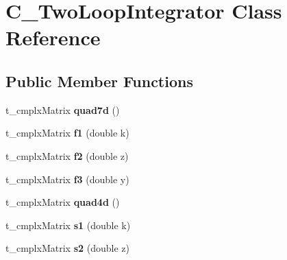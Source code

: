 \hypertarget{class_c___two_loop_integrator}{\section{C\-\_\-\-Two\-Loop\-Integrator Class Reference}
\label{class_c___two_loop_integrator}
}
\subsection*{Public Member Functions}
\begin{DoxyCompactItemize}
\item 
\hypertarget{class_c___two_loop_integrator_ae493d00905d3098c650d4c4fed00055e}{t\-\_\-cmplx\-Matrix {\bfseries quad7d} ()}\label{class_c___two_loop_integrator_ae493d00905d3098c650d4c4fed00055e}

\item 
\hypertarget{class_c___two_loop_integrator_a30474089f99ca679bdf0f9f1b85c40c2}{t\-\_\-cmplx\-Matrix {\bfseries f1} (double k)}\label{class_c___two_loop_integrator_a30474089f99ca679bdf0f9f1b85c40c2}

\item 
\hypertarget{class_c___two_loop_integrator_a3596a54102b6f6ef73ddaba13bb0a311}{t\-\_\-cmplx\-Matrix {\bfseries f2} (double z)}\label{class_c___two_loop_integrator_a3596a54102b6f6ef73ddaba13bb0a311}

\item 
\hypertarget{class_c___two_loop_integrator_a24eda9aebb16b0a5b636bd49d3dc0ace}{t\-\_\-cmplx\-Matrix {\bfseries f3} (double y)}\label{class_c___two_loop_integrator_a24eda9aebb16b0a5b636bd49d3dc0ace}

\item 
\hypertarget{class_c___two_loop_integrator_a0d87fd19da34225d8774717764ccabd6}{t\-\_\-cmplx\-Matrix {\bfseries quad4d} ()}\label{class_c___two_loop_integrator_a0d87fd19da34225d8774717764ccabd6}

\item 
\hypertarget{class_c___two_loop_integrator_a4e89475ff4a83b76d04068f25763d246}{t\-\_\-cmplx\-Matrix {\bfseries s1} (double k)}\label{class_c___two_loop_integrator_a4e89475ff4a83b76d04068f25763d246}

\item 
\hypertarget{class_c___two_loop_integrator_a723794fa4be88de17c9cc37ded212ec1}{t\-\_\-cmplx\-Matrix {\bfseries s2} (double z)}\label{class_c___two_loop_integrator_a723794fa4be88de17c9cc37ded212ec1}


\end{DoxyCompactItemize}
